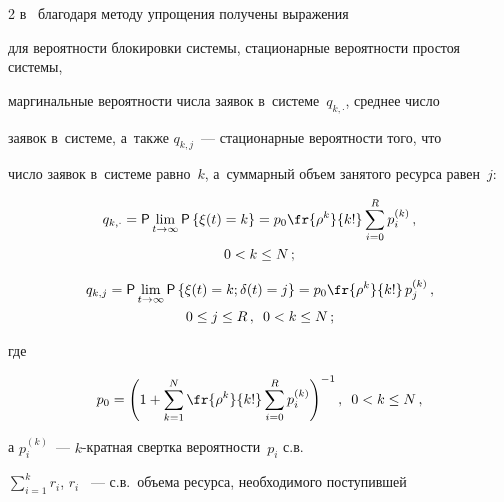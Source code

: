 \begin{multicols}{2}
в~\cite{Sopin_4_2015,Sopin_5_2015} благодаря методу упрощения получены выражения 


для вероятности блокировки сис\-те\-мы, стационарные вероятности простоя системы, 


маргинальные вероятности числа заявок в~сис\-те\-ме~$q_{k,\cdot}$, среднее чис\-ло 


заявок в~сис\-те\-ме, а~также $q_{k,j}$~--- стационарные вероятности того, что 


число заявок в~сис\-те\-ме равно~$k$, а~суммарный объем занятого ресурса равен~$j$:


\begin{multline*}


q_{k,\cdot}={\sf P}\lim_{t\rightarrow \infty}{\sf P}\left\{ \xi(t)=k 


\right\}=p_0\fr{\rho^k}{k!}\sum\limits_{i=0}^{R}p_i^{(k)}\,,


\\ 0<k\leq N\,;


\end{multline*}





\vspace*{-12pt}





\noindent


\begin{multline*}


q_{k,j}={\sf P}\lim\limits_{t\rightarrow \infty}{\sf P} \left\{ \xi(t)=k; 


\delta(t)=j\right\}=p_0\fr{\rho^k}{k!}\,p_j^{(k)}\,,


\\ 0\leq j\leq R\,,\enskip 0<k\leq N\,;


\end{multline*}


где


\begin{equation*}


p_0=\left( 1+\sum\limits_{k=1}^{N}\fr{\rho^k}{k!}\sum_{i=0}^{R}p_i^{(k)} 


\right)^{-1},


\enskip 0<k\leq N\,,


\end{equation*}


а $p^{(k)}_i$~--- $k$-кратная свертка вероятности~$p_i$ с.в.\ 


$\sum\nolimits_{i=1}^{k}r_i$, $r_i$ ~--- с.в.\ объема ресурса, необходимого поступившей 



\end{multicols}
